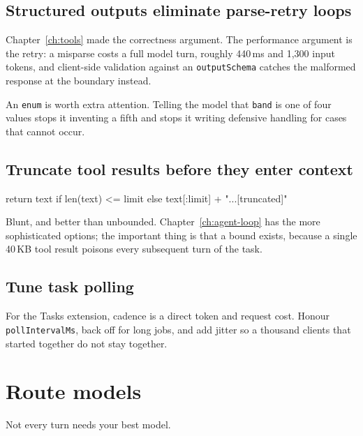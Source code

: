 \subsection{Structured outputs eliminate parse-retry loops}

Chapter~\ref{ch:tools} made the correctness argument. The performance argument
is the retry: a misparse costs a full model turn, roughly 440\,ms and 1,300
input tokens, and client-side validation against an \texttt{outputSchema} catches
the malformed response at the boundary instead.

An \texttt{enum} is worth extra attention. Telling the model that \texttt{band}
is one of four values stops it inventing a fifth and stops it writing defensive
handling for cases that cannot occur.

\subsection{Truncate tool results before they enter context}

\begin{py}
return text if len(text) <= limit else text[:limit] + "...[truncated]"
\end{py}

Blunt, and better than unbounded. Chapter~\ref{ch:agent-loop} has the more
sophisticated options; the important thing is that a bound exists, because a
single 40\,KB tool result poisons every subsequent turn of the task.

\subsection{Tune task polling}

For the Tasks extension, cadence is a direct token and request cost. Honour
\texttt{pollIntervalMs}, back off for long jobs, and add jitter so a thousand
clients that started together do not stay together.

\section{Route models}

Not every turn needs your best model.

